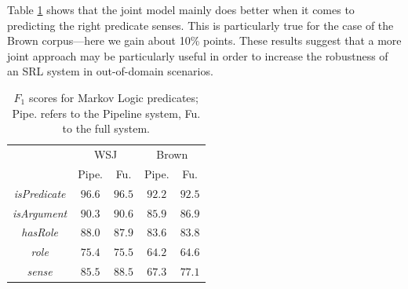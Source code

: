 Table \ref{tbl:predicates} shows that the joint model mainly does better when it comes to predicting the right predicate senses. This is particularly true for the case of the Brown corpus---here we gain about 10\% points. These results suggest that a more joint approach may be particularly useful in order to increase the robustness of an SRL system in out-of-domain scenarios.  


\begin{table}[ht]

    \centering
    \begin{tabular}{|c|c|c|c|c|}\hline
      & \multicolumn{2}{c|}{WSJ} & \multicolumn{2}{c|}{Brown}\\
                                  & Pipe.  &  Fu.   & Pipe.  &  Fu. \\\hline 
        \emph{isPredicate}        & $96.6$ & $96.5$ & $92.2$ & $92.5$\\
        \emph{isArgument}         & $90.3$ & $90.6$ & $85.9$ & $86.9$ \\
        \emph{hasRole}            & $88.0$ & $87.9$ & $83.6$ & $83.8$ \\
        \emph{role}               & $75.4$ & $75.5$ & $64.2$ & $64.6$ \\
        \emph{sense}              & $85.5$ & $88.5$ & $67.3$ & $77.1$ \\\hline
    \end{tabular}
    \caption{$F_1$ scores for Markov Logic predicates; Pipe. refers to the Pipeline system, Fu. to the full system.}
    \label{tbl:predicates}
\end{table}



